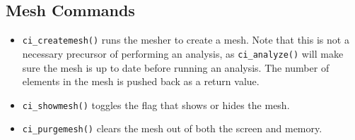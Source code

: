 \subsection{Mesh Commands}

\begin{itemize}
\item \texttt{ci\_createmesh()} runs the mesher to create a mesh. Note that this is not
a necessary precursor of performing an analysis, as
\texttt{ci\_analyze()} will make sure the mesh is up to date before
running an analysis. The number of elements in the mesh is pushed
back as a return value.

\item \texttt{ci\_showmesh()} toggles the flag that shows or hides the mesh.

\item \texttt{ci\_purgemesh()} clears the mesh out of both the screen and memory.
\end{itemize}

